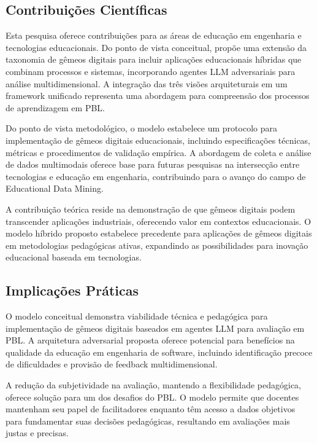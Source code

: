 \documentclass[english, spanish, brazilian]{modelo_dt}
\begin{document}
\subsection{Contribuições Científicas}

Esta pesquisa oferece contribuições para as áreas de educação em engenharia e tecnologias educacionais\@. Do ponto de vista conceitual, propõe uma extensão da taxonomia de gêmeos digitais para incluir aplicações educacionais híbridas que combinam processos e sistemas, incorporando agentes LLM adversariais para análise multidimensional\@. A integração das três visões arquiteturais em um framework unificado representa uma abordagem para compreensão dos processos de aprendizagem em PBL\@.

Do ponto de vista metodológico, o modelo estabelece um protocolo para implementação de gêmeos digitais educacionais, incluindo especificações técnicas, métricas e procedimentos de validação empírica\@. A abordagem de coleta e análise de dados multimodais oferece base para futuras pesquisas na intersecção entre tecnologias e educação em engenharia, contribuindo para o avanço do campo de Educational Data Mining\@.

A contribuição teórica reside na demonstração de que gêmeos digitais podem transcender aplicações industriais, oferecendo valor em contextos educacionais\@. O modelo híbrido proposto estabelece precedente para aplicações de gêmeos digitais em metodologias pedagógicas ativas, expandindo as possibilidades para inovação educacional baseada em tecnologias\@.

\subsection{Implicações Práticas}

O modelo conceitual demonstra viabilidade técnica e pedagógica para implementação de gêmeos digitais baseados em agentes LLM para avaliação em PBL\@. A arquitetura adversarial proposta oferece potencial para benefícios na qualidade da educação em engenharia de software, incluindo identificação precoce de dificuldades e provisão de feedback multidimensional\@.

A redução da subjetividade na avaliação, mantendo a flexibilidade pedagógica, oferece solução para um dos desafios do PBL\@. O modelo permite que docentes mantenham seu papel de facilitadores enquanto têm acesso a dados objetivos para fundamentar suas decisões pedagógicas, resultando em avaliações mais justas e precisas\@.
\end{document}

